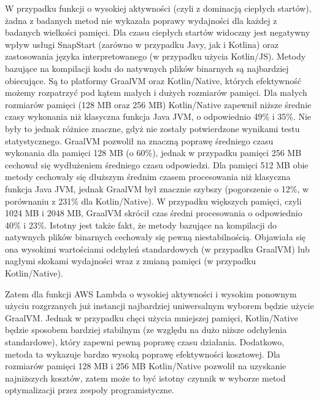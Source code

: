 W przypadku funkcji o wysokiej aktywności (czyli z dominacją ciepłych startów), żadna z badanych metod nie wykazała poprawy wydajności dla każdej z badanych wielkości pamięci.
Dla czasu ciepłych startów widoczny jest negatywny wpływ usługi SnapStart (zarówno w przypadku Javy, jak i Kotlina) oraz zastosowania języka interpretowanego (w przypadku użycia Kotlin/JS).
Metody bazujące na kompilacji kodu do natywnych plików binarnych są najbardziej obiecujące.
Są to platformy GraalVM oraz Kotlin/Native, których efektywność możemy rozpatrzyć pod kątem małych i dużych rozmiarów pamięci.
Dla małych rozmiarów pamięci (128 MB oraz 256 MB) Kotlin/Native zapewnił niższe średnie czasy wykonania niż klasyczna funkcja Java JVM, o odpowiednio 49\% i 35\%.
Nie były to jednak różnice znaczne, gdyż nie zostały potwierdzone wynikami testu statystycznego.
GraalVM pozwolił na znaczną poprawę średniego czasu wykonania dla pamięci 128 MB (o 60\%), jednak w przypadku pamięci 256 MB cechował się wydłużeniem średniego czasu odpowiedzi.
Dla pamięci 512 MB obie metody cechowały się dłuższym średnim czasem procesowania niż klasyczna funkcja Java JVM, jednak GraalVM był znacznie szybszy (pogorszenie o 12\%, w porównaniu z 231\% dla Kotlin/Native).
W przypadku większych pamięci, czyli 1024 MB i 2048 MB, GraalVM skrócił czas średni procesowania o odpowiednio 40\% i 23\%.
Istotny jest także fakt, że metody bazujące na kompilacji do natywnych plików binarnych cechowały się pewną niestabilnością.
Objawiała się ona wysokimi wartościami odchyleń standardowych (w przypadku GraalVM) lub nagłymi skokami wydajności wraz z zmianą pamięci (w przypadku Kotlin/Native).

Zatem dla funkcji AWS Lambda o wysokiej aktywności i wysokim ponownym użyciu rozgrzanych już instancji najbardziej uniwersalnym wyborem będzie użycie GraalVM.
Jednak w przypadku chęci użycia mniejszej pamięci, Kotlin/Native będzie sposobem bardziej stabilnym (ze względu na dużo niższe odchylenia standardowe), który zapewni pewną poprawę czasu działania.
Dodatkowo, metoda ta wykazuje bardzo wysoką poprawę efektywności kosztowej.
Dla rozmiarów pamięci 128 MB i 256 MB Kotlin/Native pozwolił na uzyskanie najniższych kosztów, zatem może to być istotny czynnik w wyborze metod optymalizacji przez zespoły programistyczne.

